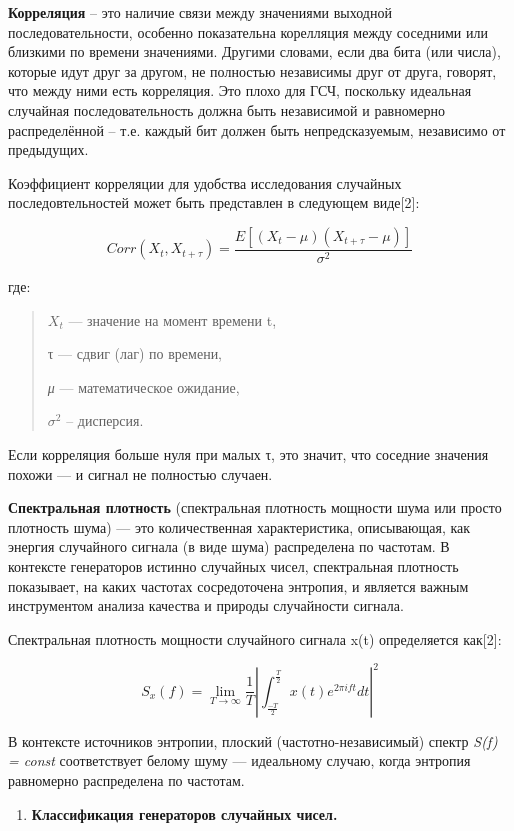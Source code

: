 \textbf{Корреляция} -- это наличие связи между значениями выходной
последовательности, особенно показательна корелляция между соседними или
близкими по времени значениями. Другими словами, если два бита (или
числа), которые идут друг за другом, не полностью независимы друг от
друга, говорят, что между ними есть корреляция. Это плохо для ГСЧ,
поскольку идеальная случайная последовательность должна быть независимой
и равномерно распределённой -- т.е. каждый бит должен быть
непредсказуемым, независимо от предыдущих.

Коэффициент корреляции для удобства исследования случайных
последовтельностей может быть представлен в следующем виде{[}2{]}:

\[Corr(X_{t},X_{t + \tau}) = \frac{E\left\lbrack (X_{t} - \mu)(X_{t + \tau} - \mu) \right\rbrack}{\sigma^{2}}\]

где:

\begin{quote}
\(X_{t}\) --- значение на момент времени t,

τ --- сдвиг (лаг) по времени,

\emph{μ} --- математическое ожидание,

\(\sigma^{2}\) -- дисперсия.
\end{quote}

Если корреляция больше нуля при малых τ, это значит, что соседние
значения похожи --- и сигнал не полностью случаен.

\textbf{Спектральная плотность} (спектральная плотность мощности шума
или просто плотность шума) --- это количественная характеристика,
описывающая, как энергия случайного сигнала (в виде шума) распределена
по частотам. В контексте генераторов истинно случайных чисел,
спектральная плотность показывает, на каких частотах сосредоточена
энтропия, и является важным инструментом анализа качества и природы
случайности сигнала.

Спектральная плотность мощности случайного сигнала x(t) определяется
как{[}2{]}:

\[S_{x}(f) = {\lim_{T \rightarrow \infty}{\frac{1}{T}\left| \int_{\frac{- T}{2}}^{\frac{T}{2}}{x(t)e^{2\pi ift}}dt \right|}}^{2}\]

В контексте источников энтропии, плоский (частотно-независимый) спектр
\emph{S(f) = const} соответствует белому шуму --- идеальному случаю,
когда энтропия равномерно распределена по частотам.

\begin{enumerate}
\def\labelenumi{\arabic{enumi}.}
\setcounter{enumi}{1}
\item
  \textbf{Классификация генераторов случайных чисел.}
\end{enumerate}

